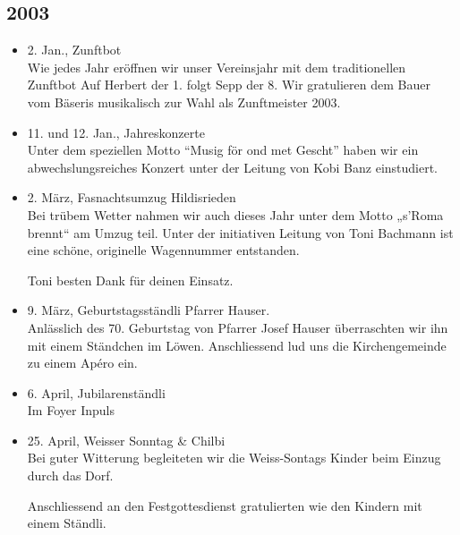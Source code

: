 \subsection{2003}

\begin{history}

    \begin{itemize}

        \item 2. Jan., Zunftbot\\
              Wie jedes Jahr eröffnen wir unser Vereinsjahr mit dem traditionellen
              Zunftbot Auf Herbert der 1. folgt Sepp der 8. Wir gratulieren dem Bauer
              vom Bäseris musikalisch zur Wahl als Zunftmeister 2003.

        \item 11. und 12. Jan., Jahreskonzerte\\
              Unter dem speziellen Motto \enquote{Musig för ond met Gescht} haben wir
              ein abwechslungsreiches Konzert unter der Leitung von Kobi Banz
              einstudiert.

        \item 2. März, Fasnachtsumzug Hildisrieden\\
              Bei trübem Wetter nahmen wir auch dieses Jahr unter dem Motto „s’Roma
              brennt“ am Umzug teil. Unter der initiativen Leitung von Toni Bachmann
              ist eine schöne, originelle Wagennummer entstanden.

              Toni besten Dank für deinen Einsatz.

        \item 9. März, Geburtstagsständli Pfarrer Hauser.\\
              Anlässlich des 70. Geburtstag von Pfarrer Josef Hauser überraschten wir
              ihn mit einem Ständchen im Löwen. Anschliessend lud uns die
              Kirchengemeinde zu einem Apéro ein.

        \item 6. April, Jubilarenständli\\
              Im Foyer Inpuls

        \item 25. April, Weisser Sonntag \& Chilbi\\
              Bei guter Witterung begleiteten wir die Weiss-Sontags Kinder beim Einzug
              durch das Dorf.

              Anschliessend an den Festgottesdienst gratulierten wie den Kindern mit
              einem Ständli.


\end{itemize}
\end{history}
